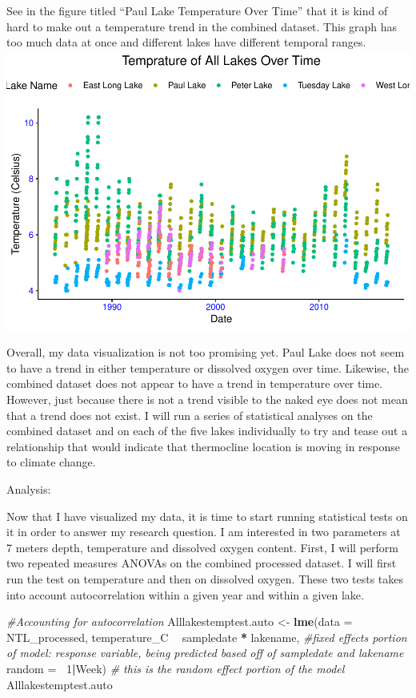 \documentclass[12pt,]{article}
\newenvironment{Shaded}{\begin{snugshade}}{\end{snugshade}}
\newcommand{\KeywordTok}[1]{\textcolor[rgb]{0.13,0.29,0.53}{\textbf{#1}}}
\newcommand{\DataTypeTok}[1]{\textcolor[rgb]{0.13,0.29,0.53}{#1}}
\newcommand{\DecValTok}[1]{\textcolor[rgb]{0.00,0.00,0.81}{#1}}
\newcommand{\StringTok}[1]{\textcolor[rgb]{0.31,0.60,0.02}{#1}}
\newcommand{\CommentTok}[1]{\textcolor[rgb]{0.56,0.35,0.01}{\textit{#1}}}
\newcommand{\OperatorTok}[1]{\textcolor[rgb]{0.81,0.36,0.00}{\textbf{#1}}}
\newcommand{\NormalTok}[1]{#1}
\begin{document}
See in the figure titled ``Paul Lake Temperature Over Time'' that it is
kind of hard to make out a temperature trend in the combined dataset.
This graph has too much data at once and different lakes have different
temporal ranges.
\includegraphics{Bollt_ENV872_FinalProject_files/figure-latex/visualization5-1.pdf}

Overall, my data visualization is not too promising yet. Paul Lake does
not seem to have a trend in either temperature or dissolved oxygen over
time. Likewise, the combined dataset does not appear to have a trend in
temperature over time. However, just because there is not a trend
visible to the naked eye does not mean that a trend does not exist. I
will run a series of statistical analyses on the combined dataset and on
each of the five lakes individually to try and tease out a relationship
that would indicate that thermocline location is moving in response to
climate change.

Analysis:

Now that I have visualized my data, it is time to start running
statistical tests on it in order to answer my research question. I am
interested in two parameters at 7 meters depth, temperature and
dissolved oxygen content. First, I will perform two repeated measures
ANOVAs on the combined processed dataset. I will first run the test on
temperature and then on dissolved oxygen. These two tests takes into
account autocorrelation within a given year and within a given lake.

\begin{Shaded}
\begin{Highlighting}[]
\CommentTok{#Accounting for autocorrelation}
\NormalTok{Alllakestemptest.auto <-}\StringTok{ }\KeywordTok{lme}\NormalTok{(}\DataTypeTok{data =}\NormalTok{ NTL_processed, }
\NormalTok{                     temperature_C }\OperatorTok{~}\StringTok{ }\NormalTok{sampledate }\OperatorTok{*}\StringTok{ }\NormalTok{lakename, }\CommentTok{#fixed effects portion of model: response variable, being predicted based off of sampledate and lakename}
                     \DataTypeTok{random =} \OperatorTok{~}\DecValTok{1}\OperatorTok{|}\NormalTok{Week)  }\CommentTok{# this is the random effect portion of the model}
\NormalTok{Alllakestemptest.auto}
\end{Highlighting}
\end{Shaded}
\end{document}
